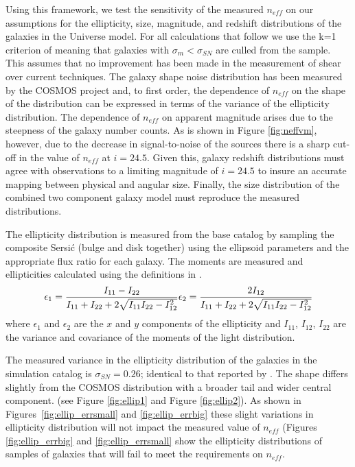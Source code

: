 \documentclass[]{article}
\begin{document}
{Using this framework, we test the sensitivity of the measured
$n_{eff}$ on our assumptions for the ellipticity, size, magnitude, and
redshift distributions of the galaxies in the Universe model.  For all
calculations that follow we use the k=1 criterion of \citet{chang}
meaning that galaxies with $\sigma_m < \sigma_{SN}$ are culled from
the sample. This assumes that no improvement has been made in the
measurement of shear over current techniques.  The galaxy shape noise
distribution has been measured by the COSMOS project \citep{cosmos}
and, to first order, the dependence of $n_{eff}$ on the shape of the
distribution can be expressed in terms of the variance of the
ellipticity distribution. The dependence of $n_{eff}$ on apparent
magnitude arises due to the steepness of the galaxy number counts. As
is shown in Figure \ref{fig:neffvm}, however, due to the decrease in
signal-to-noise of the sources there is a sharp cut-off in the value
of $n_{eff}$ at $i=24.5$.  Given this, galaxy redshift distributions
must agree with observations to a limiting magnitude of $i=24.5$ to
insure an accurate mapping between physical and angular size.
Finally, the size distribution of the combined two component galaxy
model must reproduce the measured distributions.

The ellipticity distribution is measured from the base catalog by
sampling the composite Sersi{\'c} (bulge and disk together) using the
ellipsoid parameters and the appropriate flux ratio for each galaxy.
The moments are measured and ellipticities calculated using the
definitions in \citet{chang}.
\begin{equation}
\epsilon_1 = \frac{I_{11}-I_{22}}{I_{11}+I_{22}+2\sqrt{I_{11}I_{22} - I^{2}_{12}}}\\
\epsilon_2 = \frac{2I_{12}}{I_{11}+I_{22}+2\sqrt{I_{11}I_{22} - I^{2}_{12}}}
\end{equation}
where $\epsilon_1$ and $\epsilon_2$ are the $x$ and $y$ components of
the ellipticity and $I_{11}$, $I_{12}$, $I_{22}$ are the variance and
covariance of the moments of the light distribution.

The measured variance in the ellipticity distribution of the galaxies
in the simulation catalog is $\sigma_{SN} = 0.26$; identical to that
reported by \citet{chang}. The shape differs slightly from the COSMOS
distribution with a broader tail and wider central component. (see
Figure \ref{fig:ellip1} and Figure \ref{fig:ellip2}).  As shown in
Figures~\ref{fig:ellip_errsmall} and \ref{fig:ellip_errbig} these
slight variations in ellipticity distribution will not impact the
measured value of $n_{eff}$ (Figures \ref{fig:ellip_errbig} and
\ref{fig:ellip_errsmall} show the ellipticity distributions of samples
of galaxies that will fail to meet the requirements on $n_{eff}$.

}
\end{document}
